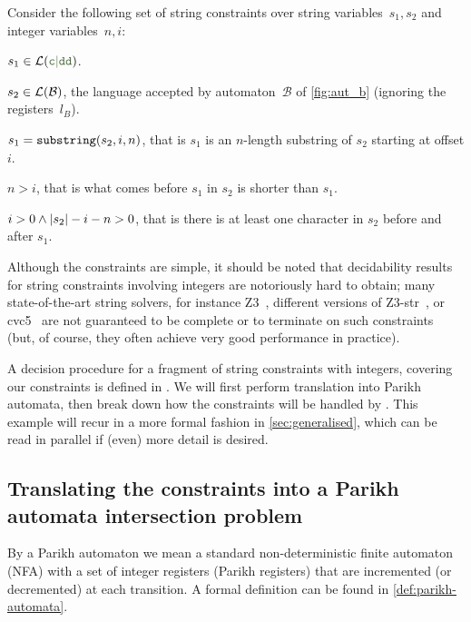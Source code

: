 \begin{example}\label{ex:string-constraints} Consider the following set of
    string constraints over string variables~$s_1, s_2$ and integer
    variables~$n, i$:
\begin{constraints}
    \item\label{const:s1-in-c-dd} $s_1 \in \Language(\Regex{c\RegexOr{}dd})$.
    \item\label{const:s2-in-b} $s_2 \in \operatorname{\mathcal{L}}(\mathcal{B})$, the language accepted by
    automaton~$\mathcal{B}$ of \cref{fig:aut_b} (ignoring
    the registers~$l_B$).
    \item\label{const:s1-substring} $s_1 = \operatorname{\mathtt{substring}}(s_2, i, n)$, that is $s_1$ is an
    $n$-length substring of $s_2$ starting at offset $i$.
    \item\label{const:more-inside-than-before} $n > i$, that is what comes
    before $s_1$ in $s_2$ is shorter than $s_1$.
    \item\label{const:something-before-and-after} $i > 0 \land |s_2| -i -n > 0$, that
    is there is at least one character in $s_2$ before and after $s_1$.
\end{constraints}
\end{example}

Although the constraints are simple, it should be noted that
decidability results for string constraints involving integers are
notoriously hard to obtain; many state-of-the-art string solvers, for
instance Z3~\cite{Z3}, different versions of
Z3-str~\cite{Z3-str,DBLP:conf/fm/MoraBKNG21}, or
cvc5~\cite{cvc5}
are not guaranteed to be complete or to terminate on such constraints
(but, of course, they often achieve very good performance in practice).

A decision procedure for a fragment of string constraints with integers,
covering our constraints is defined in
\cite{ostrich-plus}.
%
We will first perform translation into Parikh
automata, then break down how the constraints will be handled by \Calculus{}.
This example will recur in a more formal fashion in \cref{sec:generalised},
which can be read in parallel if (even) more detail is desired.

\subsection{Translating the constraints into a Parikh automata intersection problem}

By a Parikh automaton we mean a standard non-deterministic finite automaton
(NFA) with a set of integer registers (Parikh registers) that are incremented
(or decremented) at each transition. A formal definition can be found in
\cref{def:parikh-automata}.

